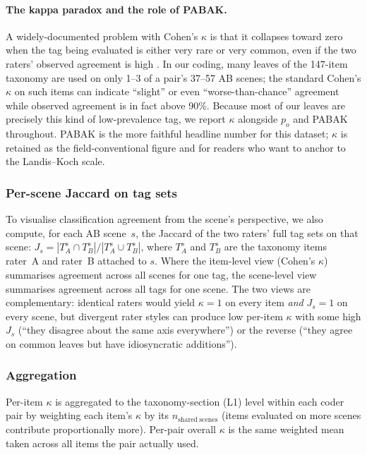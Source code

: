 \paragraph{The kappa paradox and the role of PABAK.}
A widely-documented problem with Cohen's $\kappa$ is that it collapses toward zero when the tag being evaluated is either very rare or very common, even if the two raters' observed agreement is high \citep{feinstein1990,sim2005}. In our coding, many leaves of the 147-item taxonomy are used on only 1--3 of a pair's 37--57 AB scenes; the standard Cohen's $\kappa$ on such items can indicate ``slight'' or even ``worse-than-chance'' agreement while observed agreement is in fact above 90\%. Because most of our leaves are precisely this kind of low-prevalence tag, we report $\kappa$ alongside $p_o$ and PABAK throughout. PABAK is the more faithful headline number for this dataset; $\kappa$ is retained as the field-conventional figure and for readers who want to anchor to the Landis--Koch scale.

\subsubsection*{Per-scene Jaccard on tag sets}
To visualise classification agreement from the scene's perspective, we also compute, for each AB scene~$s$, the Jaccard of the two raters' full tag sets on that scene: $J_s = |T_A^s \cap T_B^s| / |T_A^s \cup T_B^s|$, where $T_A^s$ and $T_B^s$ are the taxonomy items rater~A and rater~B attached to $s$. Where the item-level view (Cohen's $\kappa$) summarises agreement across all scenes for one tag, the scene-level view summarises agreement across all tags for one scene. The two views are complementary: identical raters would yield $\kappa=1$ on every item \emph{and} $J_s=1$ on every scene, but divergent rater styles can produce low per-item $\kappa$ with some high $J_s$ (``they disagree about the same axis everywhere'') or the reverse (``they agree on common leaves but have idiosyncratic additions'').

\subsubsection*{Aggregation}
Per-item $\kappa$ is aggregated to the taxonomy-section (L1) level within each coder pair by weighting each item's $\kappa$ by its $n_{\mathrm{shared\ scenes}}$ (items evaluated on more scenes contribute proportionally more). Per-pair overall $\kappa$ is the same weighted mean taken across all items the pair actually used.

